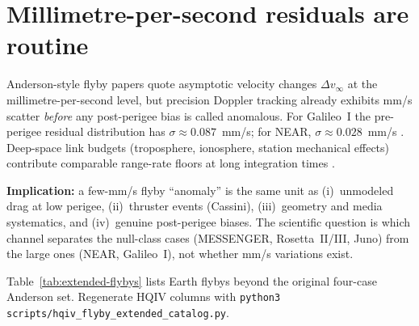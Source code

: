 \documentclass[11pt]{amsart}
\begin{document}
\section{Millimetre-per-second residuals are routine}\label{sec:mm-s-routine}

Anderson-style flyby papers quote asymptotic velocity changes $\Delta v_\infty$ at the
millimetre-per-second level, but precision Doppler tracking already exhibits mm/s scatter
\emph{before} any post-perigee bias is called anomalous. For Galileo~I the pre-perigee
residual distribution has $\sigma\approx 0.087$~mm/s; for NEAR, $\sigma\approx 0.028$~mm/s
\cite{anderson2008}. Deep-space link budgets (troposphere, ionosphere, station mechanical
effects) contribute comparable range-rate floors at long integration times
\cite{thorne2004doppler}.

\textbf{Implication:} a few-mm/s flyby ``anomaly'' is the same unit as (i)~unmodeled drag
at low perigee, (ii)~thruster events (Cassini), (iii)~geometry and media systematics, and
(iv)~genuine post-perigee biases. The scientific question is which channel separates the
null-class cases (MESSENGER, Rosetta~II/III, Juno) from the large ones (NEAR, Galileo~I),
not whether mm/s variations exist.

Table~\ref{tab:extended-flybys} lists Earth flybys beyond the original four-case Anderson
set. Regenerate HQIV columns with
\texttt{python3 scripts/hqiv\_flyby\_extended\_catalog.py}.
\end{document}
